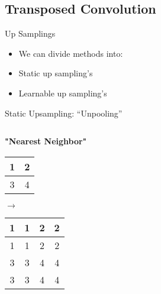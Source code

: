 \documentclass[serif, aspectratio=169]{beamer}
\begin{document}
\subsection{Transposed Convolution}

\begin{frame}{Up Samplings}
    \begin{itemize}
        \item[] We can divide methods into:
        \vspace{0.3cm}
        \item Static up sampling's
        \item Learnable up sampling's
    \end{itemize}
\end{frame}


\begin{frame}{Static Upsampling: ``Unpooling''}

\begin{columns}[c]
    \begin{column}{0.5\textwidth}
        \centering
        \textbf{"Nearest Neighbor"}\\
        \vspace{0.3cm}
        \begin{tabular}{|c|c|}
            \hline
            1 & 2 \\ \hline
            3 & 4 \\ \hline
        \end{tabular}
        \hspace{0.3cm} $\longrightarrow$ \hspace{0.3cm}
        \begin{tabular}{|c|c|c|c|}
            \hline
            1 & 1 & 2 & 2 \\ \hline
            1 & 1 & 2 & 2 \\ \hline
            3 & 3 & 4 & 4 \\ \hline
            3 & 3 & 4 & 4 \\ \hline
        \end{tabular}
        \vspace{0.3cm}\\
          \begin{flushleft}
        \end{flushleft}
    \end{column}


\end{columns}
\end{frame}
\end{document}
